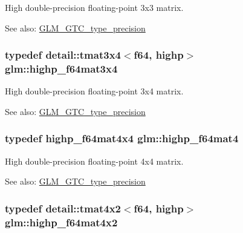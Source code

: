 High double-precision floating-point 3x3 matrix. \begin{Desc}
\item[See also:]\hyperlink{group__gtc__type__precision}{GLM\_\-GTC\_\-type\_\-precision} \end{Desc}
\hypertarget{group__gtc__type__precision_g4144f547189dd7e52b4dd282f41a1cd1}{
\subsubsection[highp\_\-f64mat3x4]{\setlength{\rightskip}{0pt plus 5cm}typedef detail::tmat3x4$<$f64, highp$>$ {\bf glm::highp\_\-f64mat3x4}}}
\label{group__gtc__type__precision_g4144f547189dd7e52b4dd282f41a1cd1}


High double-precision floating-point 3x4 matrix. \begin{Desc}
\item[See also:]\hyperlink{group__gtc__type__precision}{GLM\_\-GTC\_\-type\_\-precision} \end{Desc}
\hypertarget{group__gtc__type__precision_g1ac5d0564721a22765c68c54a0a4f87a}{
\subsubsection[highp\_\-f64mat4]{\setlength{\rightskip}{0pt plus 5cm}typedef highp\_\-f64mat4x4 {\bf glm::highp\_\-f64mat4}}}
\label{group__gtc__type__precision_g1ac5d0564721a22765c68c54a0a4f87a}


High double-precision floating-point 4x4 matrix. \begin{Desc}
\item[See also:]\hyperlink{group__gtc__type__precision}{GLM\_\-GTC\_\-type\_\-precision} \end{Desc}
\hypertarget{group__gtc__type__precision_gbe9bc3680e7d83a7b34297da518a8117}{
\subsubsection[highp\_\-f64mat4x2]{\setlength{\rightskip}{0pt plus 5cm}typedef detail::tmat4x2$<$f64, highp$>$ {\bf glm::highp\_\-f64mat4x2}}}
\label{group__gtc__type__precision_gbe9bc3680e7d83a7b34297da518a8117}


